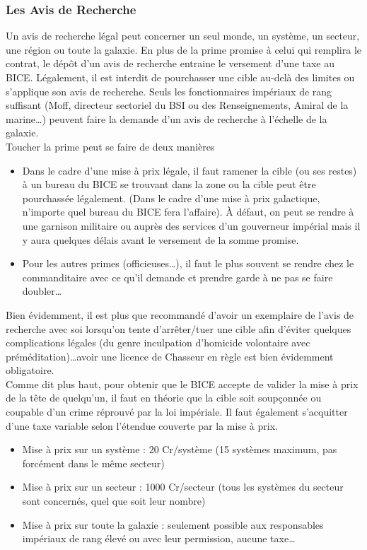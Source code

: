 \documentclass[twoside]{article}
\begin{document}
\subsubsection{Les Avis de Recherche}
Un avis de recherche légal peut concerner un seul monde, un système, un secteur, une région ou toute la galaxie. En plus de la prime promise à celui qui remplira le contrat, le dépôt d'un avis de recherche entraine le versement d'une taxe au BICE.
Légalement, il est interdit de pourchasser une cible au-delà des limites ou s'applique son avis de recherche. Seuls les fonctionnaires impériaux de rang suffisant (Moff, directeur sectoriel du BSI ou des Renseignements, Amiral de la marine\ldots) peuvent faire la demande d'un avis de recherche à l'échelle de la galaxie.\\

Toucher la prime peut se faire de deux manières

\begin{itemize}
	\item Dans le cadre d'une mise à prix légale, il faut ramener la cible (ou ses restes) à un bureau du BICE se trouvant dans la zone ou la cible peut être pourchassée légalement. (Dans le cadre d'une mise à prix galactique, n'importe quel bureau du BICE fera l'affaire). À défaut, on peut se rendre à une garnison militaire ou auprès des services d'un gouverneur impérial mais il y aura quelques délais avant le versement de la somme promise.
	\item Pour les autres primes (officieuses\ldots), il faut le plus souvent se rendre chez  le commanditaire avec ce qu'il demande et prendre garde à ne pas se faire doubler\ldots 
\end{itemize}

Bien évidemment, il est plus que recommandé d'avoir un exemplaire de l'avis de recherche avec soi lorsqu'on tente d'arrêter/tuer une cible afin d'éviter quelques complications légales (du genre inculpation d'homicide volontaire avec préméditation)\ldots avoir une licence de Chasseur en règle est bien évidemment obligatoire.\\

Comme dit plus haut, pour obtenir que le BICE accepte de valider la mise à prix de la tête de quelqu'un, il faut en théorie que la cible soit soupçonnée ou coupable d'un crime réprouvé par la loi impériale. Il faut également s'acquitter d'une taxe variable selon l'étendue couverte par la mise à prix.

\begin{itemize}
	\item Mise à prix sur un système : 20 Cr/système (15 systèmes maximum, pas forcément dans le même secteur)
	\item Mise à prix sur un secteur : 1000 Cr/secteur (tous les systèmes du secteur sont concernés, quel que soit leur nombre)
	\item Mise à prix sur toute la galaxie : seulement possible aux responsables impériaux de rang élevé ou avec leur permission,  aucune taxe\ldots
\end{itemize}
\end{document}
